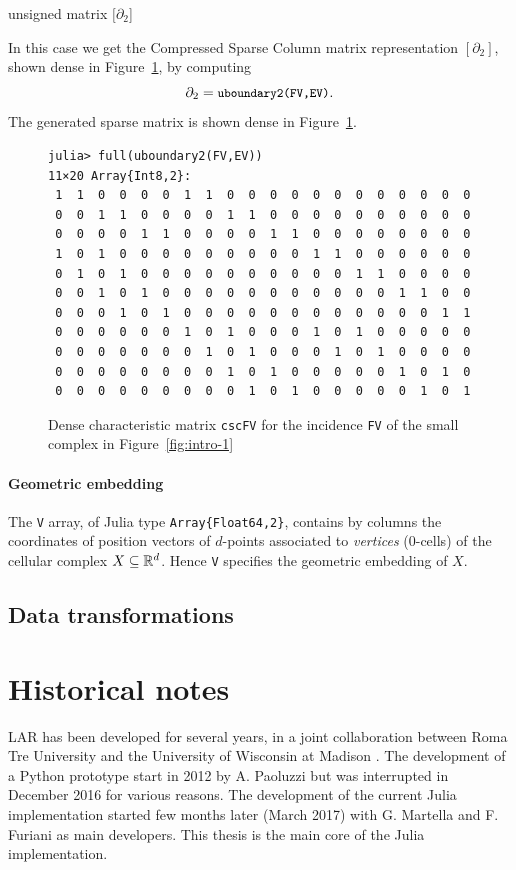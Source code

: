 \begin{example}{unsigned matrix $[\partial_2$]}

In this case we get the Compressed Sparse Column matrix representation $[∂_2]$, shown dense in Figure~\ref{fig:intro-3}, by computing
\[
\partial_2 = \small\texttt{uboundary2(FV,EV)}.
\]
The generated sparse matrix is shown dense in Figure~\ref{fig:intro-3}.
\begin{figure}[htbp] %
\small\begin{verbatim}
julia> full(uboundary2(FV,EV))
11×20 Array{Int8,2}:
 1  1  0  0  0  0  1  1  0  0  0  0  0  0  0  0  0  0  0  0
 0  0  1  1  0  0  0  0  1  1  0  0  0  0  0  0  0  0  0  0
 0  0  0  0  1  1  0  0  0  0  1  1  0  0  0  0  0  0  0  0
 1  0  1  0  0  0  0  0  0  0  0  0  1  1  0  0  0  0  0  0
 0  1  0  1  0  0  0  0  0  0  0  0  0  0  1  1  0  0  0  0
 0  0  1  0  1  0  0  0  0  0  0  0  0  0  0  0  1  1  0  0
 0  0  0  1  0  1  0  0  0  0  0  0  0  0  0  0  0  0  1  1
 0  0  0  0  0  0  1  0  1  0  0  0  1  0  1  0  0  0  0  0
 0  0  0  0  0  0  0  1  0  1  0  0  0  1  0  1  0  0  0  0
 0  0  0  0  0  0  0  0  1  0  1  0  0  0  0  0  1  0  1  0
 0  0  0  0  0  0  0  0  0  1  0  1  0  0  0  0  0  1  0  1
\end{verbatim}
   \caption{Dense characteristic matrix \texttt{cscFV} for the incidence \texttt{FV} of the small complex in Figure~\ref{fig:intro-1}}
   \label{fig:intro-3}
\end{figure}

\end{example}



\paragraph{Geometric embedding}

The \texttt{V} array, of Julia type \texttt{Array\{Float64,2\}}, contains by columns the coordinates of position vectors of $d$-points associated to \emph{vertices} (0-cells) of the cellular complex $X \subseteq \mathbb{R}^d$. Hence \texttt{V} specifies the geometric embedding of $X$.


\subsection{Data transformations}
\label{sec:transformations}



\section{Historical notes}
\label{sec:history}
LAR has been developed for several years, in a joint collaboration 
between Roma Tre University and the University 
of Wisconsin at Madison \cite{ieee-tase}. The development of a Python 
prototype start in 2012 by A. Paoluzzi but was interrupted 
in December 2016 for various reasons. The development of the current
Julia implementation started few months later (March 2017) with
G. Martella and F. Furiani as main developers. This thesis is
the main core of the Julia implementation.


